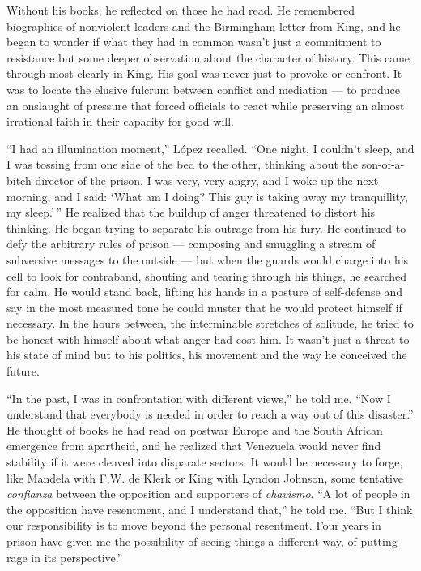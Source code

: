 Without his books, he reflected on those he had read. He remembered
biographies of nonviolent leaders and the Birmingham letter from King,
and he began to wonder if what they had in common wasn't just a
commitment to resistance but some deeper observation about the character
of history. This came through most clearly in King. His goal was never
just to provoke or confront. It was to locate the elusive fulcrum
between conflict and mediation --- to produce an onslaught of pressure
that forced officials to react while preserving an almost irrational
faith in their capacity for good will.

``I had an illumination moment,'' López recalled. ``One night, I
couldn't sleep, and I was tossing from one side of the bed to the other,
thinking about the son-of-a-bitch director of the prison. I was very,
very angry, and I woke up the next morning, and I said: `What am I
doing? This guy is taking away my tranquillity, my sleep.' '' He
realized that the buildup of anger threatened to distort his thinking.
He began trying to separate his outrage from his fury. He continued to
defy the arbitrary rules of prison --- composing and smuggling a stream
of subversive messages to the outside --- but when the guards would
charge into his cell to look for contraband, shouting and tearing
through his things, he searched for calm. He would stand back, lifting
his hands in a posture of self-defense and say in the most measured tone
he could muster that he would protect himself if necessary. In the hours
between, the interminable stretches of solitude, he tried to be honest
with himself about what anger had cost him. It wasn't just a threat to
his state of mind but to his politics, his movement and the way he
conceived the future.

``In the past, I was in confrontation with different views,'' he told
me. ``Now I understand that everybody is needed in order to reach a way
out of this disaster.'' He thought of books he had read on postwar
Europe and the South African emergence from apartheid, and he realized
that Venezuela would never find stability if it were cleaved into
disparate sectors. It would be necessary to forge, like Mandela with
F.W. de Klerk or King with Lyndon Johnson, some tentative
\emph{confianza} between the opposition and supporters of
\emph{chavismo}. ``A lot of people in the opposition have resentment,
and I understand that,'' he told me. ``But I think our responsibility is
to move beyond the personal resentment. Four years in prison have given
me the possibility of seeing things a different way, of putting rage in
its perspective.''

